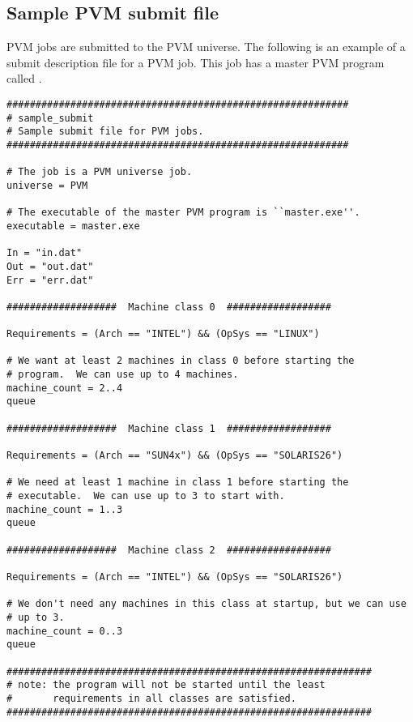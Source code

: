 \subsection{\label{sec:PVM-Submit}Sample PVM submit file}

PVM jobs are submitted to the PVM universe.
The following is an
example of a submit description file for a PVM job.  
This job has a master PVM program called .

\CondorSmall
\begin{verbatim}
###########################################################
# sample_submit
# Sample submit file for PVM jobs. 
###########################################################

# The job is a PVM universe job.
universe = PVM  

# The executable of the master PVM program is ``master.exe''.
executable = master.exe

In = "in.dat"
Out = "out.dat"
Err = "err.dat"

###################  Machine class 0  ##################

Requirements = (Arch == "INTEL") && (OpSys == "LINUX") 

# We want at least 2 machines in class 0 before starting the 
# program.  We can use up to 4 machines.
machine_count = 2..4  
queue

###################  Machine class 1  ##################

Requirements = (Arch == "SUN4x") && (OpSys == "SOLARIS26") 

# We need at least 1 machine in class 1 before starting the 
# executable.  We can use up to 3 to start with.
machine_count = 1..3
queue

###################  Machine class 2  ##################

Requirements = (Arch == "INTEL") && (OpSys == "SOLARIS26") 

# We don't need any machines in this class at startup, but we can use
# up to 3. 
machine_count = 0..3
queue

###############################################################
# note: the program will not be started until the least 
#       requirements in all classes are satisfied.
###############################################################
\end{verbatim}
\normalsize


